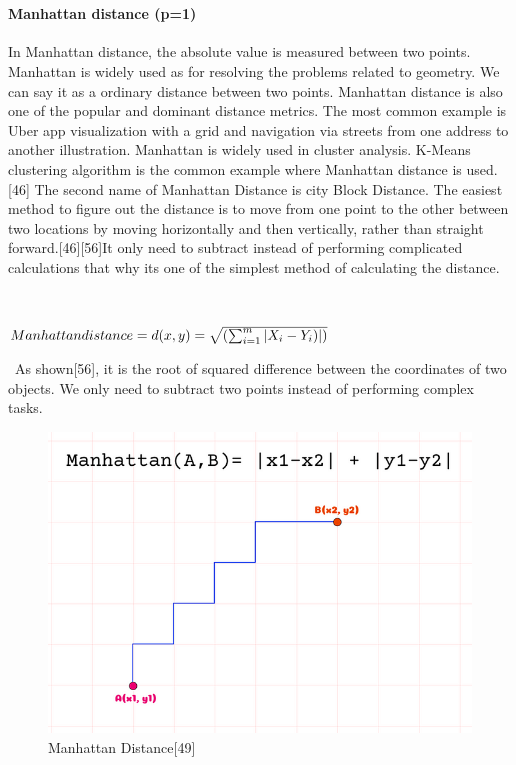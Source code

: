 \documentclass[conference]{IEEEtran}
\begin{document}
\



\paragraph{\textbf{Manhattan distance (p=1)}}
In Manhattan distance, the absolute value is measured between two points. Manhattan is widely used as for resolving the problems related to geometry. We can say it as a ordinary distance between two points. Manhattan distance is also one of the popular and dominant distance metrics. The most common example is Uber app visualization with a grid and navigation via streets from one address to another illustration. Manhattan is widely used in cluster analysis. K-Means clustering algorithm is the common example where Manhattan distance is used.[46] The second name of Manhattan Distance is city Block Distance. The easiest method to figure out the distance is to move from one point to the other between two locations by moving horizontally and then vertically, rather than straight forward.[46][56]It only need to subtract instead of performing complicated calculations that why its one of the simplest method of calculating the distance. 

\

\begin{math}
 Manhattan distance = d(x,y)=\sqrt{(\sum_{i=1}^{m} |X_{i} - Y_{i})|)}
 \newline
\end{math}

\
As shown[56], it is the root of squared difference between the coordinates of two objects. We only need to subtract two points instead of performing complex tasks. 

\begin{figure}
    \centering
    \includegraphics[width=0.8\linewidth]{a.png}
    \caption{Manhattan Distance[49]}
    \label{fig:enter-label}
\end{figure}
\end{document}
